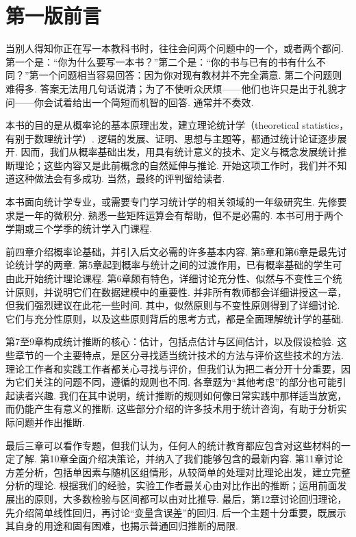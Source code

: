 \section*{第一版前言}\label{front:preface-first}
当别人得知你正在写一本教科书时，往往会问两个问题中的一个，或者两个都问. 第一个是：“你为什么要写一本书？”第二个是：“你的书与已有的书有什么不同？”第一个问题相当容易回答：因为你对现有教材并不完全满意. 第二个问题则难得多. 答案无法用几句话说清；为了不使听众厌烦——他们也许只是出于礼貌才问——你会试着给出一个简短而机智的回答. 通常并不奏效.

本书的目的是从概率论的基本原理出发，建立理论统计学（theoretical statistics，有别于数理统计学）. 逻辑的发展、证明、思想与主题等，都通过统计论证逐步展开. 因而，我们从概率基础出发，用具有统计意义的技术、定义与概念发展统计推断理论；这些内容又是此前概念的自然延伸与推论. 开始这项工作时，我们并不知道这种做法会有多成功. 当然，最终的评判留给读者.

本书面向统计学专业，或需要专门学习统计学的相关领域的一年级研究生. 先修要求是一年的微积分. 熟悉一些矩阵运算会有帮助，但不是必需的. 本书可用于两个学期或三个学季的统计学入门课程.

前四章介绍概率论基础，并引入后文必需的许多基本内容. 第5章和第6章是最先讨论统计学的两章. 第5章起到概率与统计之间的过渡作用，已有概率基础的学生可由此开始统计理论课程. 第6章颇有特色，详细讨论充分性、似然与不变性三个统计原则，并说明它们在数据建模中的重要性. 并非所有教师都会详细讲授这一章，但我们强烈建议在此花一些时间. 其中，似然原则与不变性原则得到了详细讨论. 它们与充分性原则，以及这些原则背后的思考方式，都是全面理解统计学的基础.

第7至9章构成统计推断的核心：估计，包括点估计与区间估计，以及假设检验. 这些章节的一个主要特点，是区分寻找适当统计技术的方法与评价这些技术的方法. 理论工作者和实践工作者都关心寻找与评价，但我们认为把二者分开十分重要，因为它们关注的问题不同，遵循的规则也不同. 各章题为“其他考虑”的部分也可能引起读者兴趣. 我们在其中说明，统计推断的规则如何像日常实践中那样适当放宽，而仍能产生有意义的推断. 这些部分介绍的许多技术用于统计咨询，有助于分析实际问题并作出推断.

最后三章可以看作专题，但我们认为，任何人的统计教育都应包含对这些材料的一定了解. 第10章全面介绍决策论，并纳入了我们能够包含的最新内容. 第11章讨论方差分析，包括单因素与随机区组情形，从较简单的处理对比理论出发，建立完整分析的理论. 根据我们的经验，实验工作者最关心由对比作出的推断；运用前面发展出的原则，大多数检验与区间都可以由对比推导. 最后，第12章讨论回归理论，先介绍简单线性回归，再讨论“变量含误差”的回归. 后一个主题十分重要，既展示其自身的用途和固有困难，也揭示普通回归推断的局限.

